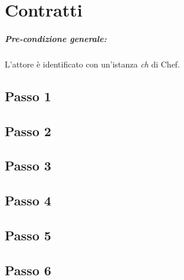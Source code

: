 \chapter{Contratti}

\paragraph{Pre-condizione generale:} L'attore è identificato con un'istanza \textit{ch} di Chef. 

\section{Passo 1}

\section{Passo 2}

\section{Passo 3}

\section{Passo 4}

\section{Passo 5}

\section{Passo 6}
